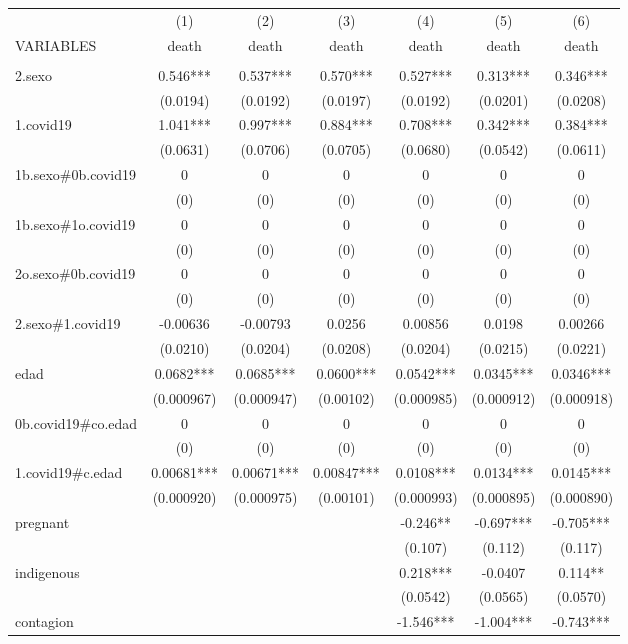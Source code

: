 \documentclass[]{article}
\begin{document}
\begin{tabular}{lcccccc} \hline
 & (1) & (2) & (3) & (4) & (5) & (6) \\
VARIABLES & death & death & death & death & death & death \\ \hline
 &  &  &  &  &  &  \\
2.sexo & 0.546*** & 0.537*** & 0.570*** & 0.527*** & 0.313*** & 0.346*** \\
 & (0.0194) & (0.0192) & (0.0197) & (0.0192) & (0.0201) & (0.0208) \\
1.covid19 & 1.041*** & 0.997*** & 0.884*** & 0.708*** & 0.342*** & 0.384*** \\
 & (0.0631) & (0.0706) & (0.0705) & (0.0680) & (0.0542) & (0.0611) \\
1b.sexo\#0b.covid19 & 0 & 0 & 0 & 0 & 0 & 0 \\
 & (0) & (0) & (0) & (0) & (0) & (0) \\
1b.sexo\#1o.covid19 & 0 & 0 & 0 & 0 & 0 & 0 \\
 & (0) & (0) & (0) & (0) & (0) & (0) \\
2o.sexo\#0b.covid19 & 0 & 0 & 0 & 0 & 0 & 0 \\
 & (0) & (0) & (0) & (0) & (0) & (0) \\
2.sexo\#1.covid19 & -0.00636 & -0.00793 & 0.0256 & 0.00856 & 0.0198 & 0.00266 \\
 & (0.0210) & (0.0204) & (0.0208) & (0.0204) & (0.0215) & (0.0221) \\
edad & 0.0682*** & 0.0685*** & 0.0600*** & 0.0542*** & 0.0345*** & 0.0346*** \\
 & (0.000967) & (0.000947) & (0.00102) & (0.000985) & (0.000912) & (0.000918) \\
0b.covid19\#co.edad & 0 & 0 & 0 & 0 & 0 & 0 \\
 & (0) & (0) & (0) & (0) & (0) & (0) \\
1.covid19\#c.edad & 0.00681*** & 0.00671*** & 0.00847*** & 0.0108*** & 0.0134*** & 0.0145*** \\
 & (0.000920) & (0.000975) & (0.00101) & (0.000993) & (0.000895) & (0.000890) \\
pregnant &  &  &  & -0.246** & -0.697*** & -0.705*** \\
 &  &  &  & (0.107) & (0.112) & (0.117) \\
indigenous &  &  &  & 0.218*** & -0.0407 & 0.114** \\
 &  &  &  & (0.0542) & (0.0565) & (0.0570) \\
contagion &  &  &  & -1.546*** & -1.004*** & -0.743*** \\

\end{tabular}
\end{document}
